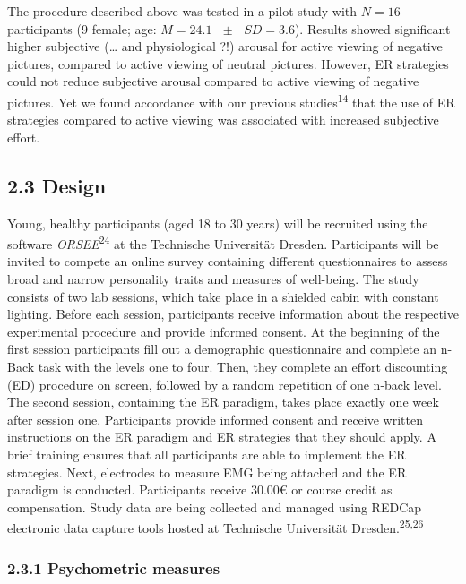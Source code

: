 \documentclass[
  english,
  man,floatsintext]{apa6}
\begin{document}
The procedure described above was tested in a pilot study with \(N=16\) participants (9 female; age: \(M = 24.1\text{ }\pm\text{ }SD = 3.6\)).
Results showed significant higher subjective (\ldots{} and physiological ?!) arousal for active viewing of negative pictures, compared to active viewing of neutral pictures.
However, ER strategies could not reduce subjective arousal compared to active viewing of negative pictures.
Yet we found accordance with our previous studies\textsuperscript{14} that the use of ER strategies compared to active viewing was associated with increased subjective effort.

\hypertarget{design}{%
\subsection{2.3 Design}\label{design}}

Young, healthy participants (aged 18 to 30 years) will be recruited using the software \emph{ORSEE}\textsuperscript{24} at the Technische Universität Dresden.
Participants will be invited to compete an online survey containing different questionnaires to assess broad and narrow personality traits and measures of well-being.
The study consists of two lab sessions, which take place in a shielded cabin with constant lighting.
Before each session, participants receive information about the respective experimental procedure and provide informed consent.
At the beginning of the first session participants fill out a demographic questionnaire and complete an n-Back task with the levels one to four.
Then, they complete an effort discounting (ED) procedure on screen, followed by a random repetition of one n-back level.
The second session, containing the ER paradigm, takes place exactly one week after session one.
Participants provide informed consent and receive written instructions on the ER paradigm and ER strategies that they should apply.
A brief training ensures that all participants are able to implement the ER strategies.
Next, electrodes to measure EMG being attached and the ER paradigm is conducted.
Participants receive 30.00€ or course credit as compensation.
Study data are being collected and managed using REDCap electronic data capture tools hosted at Technische Universität Dresden.\textsuperscript{25,26}

\hypertarget{psychometric-measures}{%
\subsubsection{2.3.1 Psychometric measures}\label{psychometric-measures}}
\end{document}
